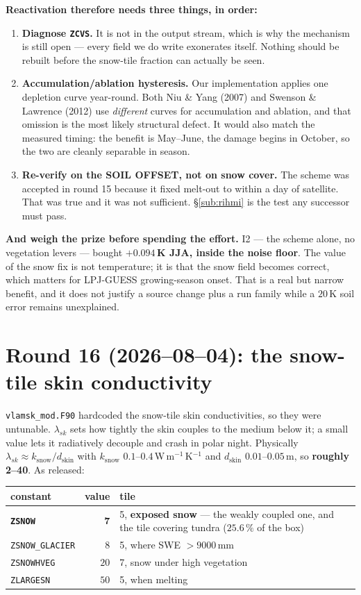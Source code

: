 \documentclass[10pt]{article}
\begin{document}
\textbf{Reactivation therefore needs three things, in order:}
\begin{enumerate}\itemsep2pt
\item \textbf{Diagnose \texttt{ZCVS}.} It is not in the output stream, which is why the
  mechanism is still open --- every field we do write exonerates itself. Nothing should be
  rebuilt before the snow-tile fraction can actually be seen.
\item \textbf{Accumulation/ablation hysteresis.} Our implementation applies one depletion
  curve year-round. Both Niu \& Yang (2007) and Swenson \& Lawrence (2012) use
  \emph{different} curves for accumulation and ablation, and that omission is the most likely
  structural defect. It would also match the measured timing: the benefit is May--June, the
  damage begins in October, so the two are cleanly separable in season.
\item \textbf{Re-verify on the SOIL OFFSET, not on snow cover.} The scheme was accepted in
  round 15 because it fixed melt-out to within a day of satellite. That was true and it was
  not sufficient. \S\ref{sub:rihmi} is the test any successor must pass.
\end{enumerate}

\textbf{And weigh the prize before spending the effort.} I2 --- the scheme alone, no
vegetation levers --- bought \textbf{$+0.094$\,K JJA, inside the noise floor}. The value of
the snow fix is not temperature; it is that the snow field becomes correct, which matters for
LPJ-GUESS growing-season onset. That is a real but narrow benefit, and it does not justify a
source change plus a run family while a $20$\,K soil error remains unexplained.

\medskip
\section{Round 16 (2026--08--04): the snow-tile skin conductivity}\label{sec:lamsk}
\texttt{vlamsk\_mod.F90} hardcoded the snow-tile skin conductivities, so they were untunable.
$\lambda_{sk}$ sets how tightly the skin couples to the medium below it; a small value lets it
radiatively decouple and crash in polar night. Physically
$\lambda_{sk} \approx k_{\mathrm{snow}}/d_{\mathrm{skin}}$ with $k_{\mathrm{snow}}$
$0.1$--$0.4$\,W\,m$^{-1}$\,K$^{-1}$ and $d_{\mathrm{skin}}$ $0.01$--$0.05$\,m, so
\textbf{roughly 2--40}. As released:

\begin{center}\footnotesize
\begin{tabular}{l r l}
\toprule
constant & value & tile \\
\midrule
\textbf{\texttt{ZSNOW}} & $\mathbf{7}$ & 5, \textbf{exposed snow} --- the weakly coupled one, and the tile covering tundra ($25.6\,\%$ of the box) \\
\texttt{ZSNOW\_GLACIER} & $8$ & 5, where SWE $>9000$\,mm \\
\texttt{ZSNOWHVEG} & $20$ & 7, snow under high vegetation \\
\texttt{ZLARGESN} & $50$ & 5, when melting \\
\bottomrule
\end{tabular}
\end{center}
\end{document}
